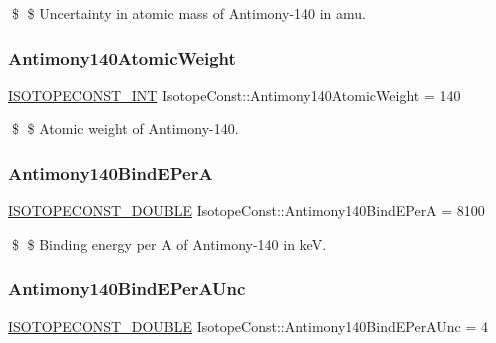 \$ \$ Uncertainty in atomic mass of Antimony-\/140 in amu. \mbox{\label{group___isotope_const-_antimony-_sb140_gaa6d0e2212dea188aaeb4c999361f781e}} 
\subsubsection{\texorpdfstring{Antimony140\+Atomic\+Weight}{Antimony140AtomicWeight}}
{\footnotesize\ttfamily \mbox{\hyperlink{group___isotope_const-_macros_ga5f18360b3e99483a35c32d789e62621c}{I\+S\+O\+T\+O\+P\+E\+C\+O\+N\+S\+T\+\_\+\+I\+NT}} Isotope\+Const\+::\+Antimony140\+Atomic\+Weight = 140}

\$ \$ Atomic weight of Antimony-\/140. \mbox{\label{group___isotope_const-_antimony-_sb140_ga9c46eb48abe854785ae9ef5cf42e7372}} 
\subsubsection{\texorpdfstring{Antimony140\+Bind\+E\+PerA}{Antimony140BindEPerA}}
{\footnotesize\ttfamily \mbox{\hyperlink{group___isotope_const-_macros_ga8f45a7272ce02c0b4c65c44636ed719a}{I\+S\+O\+T\+O\+P\+E\+C\+O\+N\+S\+T\+\_\+\+D\+O\+U\+B\+LE}} Isotope\+Const\+::\+Antimony140\+Bind\+E\+PerA = 8100}

\$ \$ Binding energy per A of Antimony-\/140 in keV. \mbox{\label{group___isotope_const-_antimony-_sb140_ga3987bd0542c1d577a1200652bd06ddc8}} 
\subsubsection{\texorpdfstring{Antimony140\+Bind\+E\+Per\+A\+Unc}{Antimony140BindEPerAUnc}}
{\footnotesize\ttfamily \mbox{\hyperlink{group___isotope_const-_macros_ga8f45a7272ce02c0b4c65c44636ed719a}{I\+S\+O\+T\+O\+P\+E\+C\+O\+N\+S\+T\+\_\+\+D\+O\+U\+B\+LE}} Isotope\+Const\+::\+Antimony140\+Bind\+E\+Per\+A\+Unc = 4}

